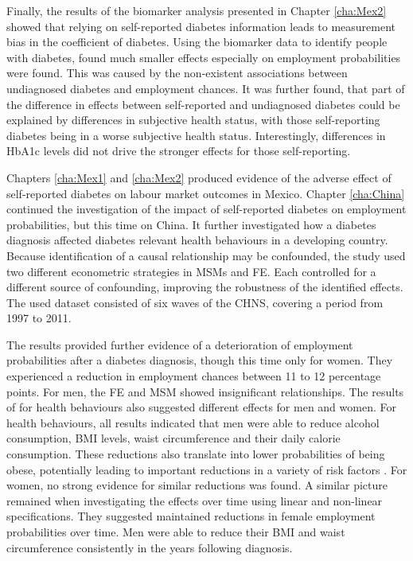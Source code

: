Finally, the results of the biomarker analysis presented in Chapter \ref{cha:Mex2} showed that relying on self-reported diabetes information leads to measurement bias in the coefficient of diabetes. Using the biomarker data to identify people with diabetes, found much smaller effects especially on employment probabilities were found. This was caused by the non-existent associations between undiagnosed diabetes and employment chances. It was further found, that part of the difference in effects between self-reported and undiagnosed diabetes could be explained by differences in subjective health status, with those self-reporting diabetes being in a worse subjective health status. Interestingly, differences in \ac{HbA1c} levels did not drive the stronger effects for those self-reporting. %

Chapters \ref{cha:Mex1} and \ref{cha:Mex2} produced evidence of the adverse effect of self-reported diabetes on labour market outcomes in Mexico. Chapter \ref{cha:China} continued the investigation of the impact of self-reported diabetes on employment probabilities, but this time on China. It further investigated how a diabetes diagnosis affected diabetes relevant health behaviours in a developing country. Because identification of a causal relationship may be confounded, the study used two different econometric strategies in \acp{MSM} and \ac{FE}. Each controlled for a different source of confounding, improving the robustness of the identified effects. The used dataset consisted of six waves of the \ac{CHNS}, covering a period from 1997 to 2011.

The results provided further evidence of a deterioration of employment probabilities after a diabetes diagnosis, though this time only for women. They experienced a reduction in employment chances between 11 to 12 percentage points. For men, the \ac{FE} and \ac{MSM} showed insignificant relationships. The results of for health behaviours also suggested different effects for men and women. For health behaviours, all results indicated that men were able to reduce alcohol consumption, \ac{BMI} levels, waist circumference and their daily calorie consumption. These reductions also translate into lower probabilities of being obese, potentially leading to important reductions in a variety of risk factors \parencite{Wilding2014}. For women, no strong evidence for similar reductions was found. A similar picture remained when investigating the effects over time using linear and non-linear specifications. They suggested maintained reductions in female employment probabilities over time. Men were able to reduce their \ac{BMI} and waist circumference consistently in the years following diagnosis.

